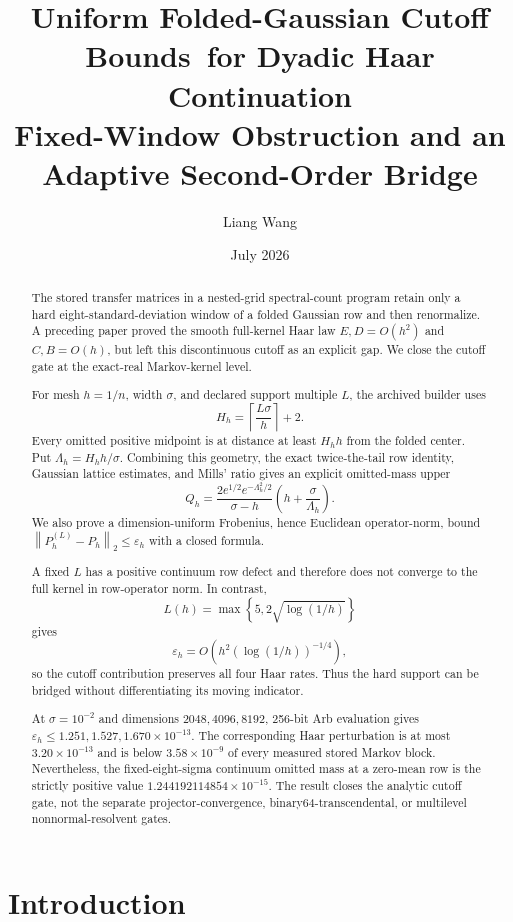 \documentclass[11pt]{article}
\title{Uniform Folded-Gaussian Cutoff Bounds\
for Dyadic Haar Continuation\\
\large Fixed-Window Obstruction and an Adaptive Second-Order Bridge}
\author{Liang Wang}
\date{July 2026}
\theoremstyle{definition}
\theoremstyle{remark}
\newcommand{\norm}[1]{\left\lVert #1\right\rVert}
\begin{document}
\maketitle

\begin{abstract}
The stored transfer matrices in a nested-grid spectral-count program retain
only a hard eight-standard-deviation window of a folded Gaussian row and then
renormalize.  A preceding paper proved the smooth full-kernel Haar law
$E,D=O(h^2)$ and $C,B=O(h)$, but left this discontinuous cutoff as an explicit
gap.  We close the cutoff gate at the exact-real Markov-kernel level.

For mesh $h=1/n$, width $\sigma$, and declared support multiple $L$, the
archived builder uses
\[
H_h=\left\lceil\frac{L\sigma}{h}\right\rceil+2.
\]
Every omitted positive midpoint is at distance at least $H_hh$ from the
folded center.  Put $\Lambda_h=H_hh/\sigma$.  Combining this geometry, the
exact twice-the-tail row identity, Gaussian lattice estimates, and Mills'
ratio gives an explicit omitted-mass upper
\[
Q_h=
\frac{2e^{1/2}e^{-\Lambda_h^2/2}}
     {\sigma-h}
\left(h+\frac{\sigma}{\Lambda_h}\right).
\]
We also prove a dimension-uniform Frobenius, hence Euclidean operator-norm,
bound $\norm{P_h^{(L)}-P_h}_2\le\varepsilon_h$ with a closed formula.

A fixed $L$ has a positive continuum row defect and therefore does not
converge to the full kernel in row-operator norm.  In contrast,
\[
L(h)=\max\left\{5,2\sqrt{\log(1/h)}\right\}
\]
gives
\[
\varepsilon_h=O\!\left(
h^2(\log(1/h))^{-1/4}
\right),
\]
so the cutoff contribution preserves all four Haar rates.  Thus the hard
support can be bridged without differentiating its moving indicator.

At $\sigma=10^{-2}$ and dimensions $2048,4096,8192$, 256-bit Arb evaluation
gives $\varepsilon_h\le1.251,1.527,1.670\times10^{-13}$.  The corresponding
Haar perturbation is at most $3.20\times10^{-13}$ and is below
$3.58\times10^{-9}$ of every measured stored Markov block.  Nevertheless,
the fixed-eight-sigma continuum omitted mass at a zero-mean row is the
strictly positive value $1.244192114854\times10^{-15}$.  The result closes
the analytic cutoff gate, not the separate projector-convergence,
binary64-transcendental, or multilevel nonnormal-resolvent gates.
\end{abstract}

\section{Introduction}
\end{document}
